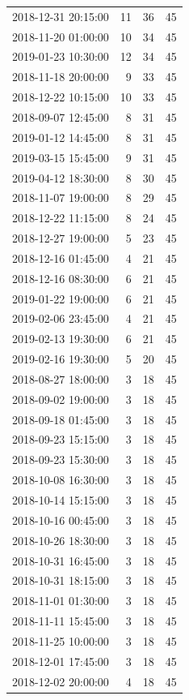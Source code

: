 \begin{tabular}{lrrr}
2018-12-31 20:15:00 & 11 & 36 & 45 \\
2018-11-20 01:00:00 & 10 & 34 & 45 \\
2019-01-23 10:30:00 & 12 & 34 & 45 \\
2018-11-18 20:00:00 & 9 & 33 & 45 \\
2018-12-22 10:15:00 & 10 & 33 & 45 \\
2018-09-07 12:45:00 & 8 & 31 & 45 \\
2019-01-12 14:45:00 & 8 & 31 & 45 \\
2019-03-15 15:45:00 & 9 & 31 & 45 \\
2019-04-12 18:30:00 & 8 & 30 & 45 \\
2018-11-07 19:00:00 & 8 & 29 & 45 \\
2018-12-22 11:15:00 & 8 & 24 & 45 \\
2018-12-27 19:00:00 & 5 & 23 & 45 \\
2018-12-16 01:45:00 & 4 & 21 & 45 \\
2018-12-16 08:30:00 & 6 & 21 & 45 \\
2019-01-22 19:00:00 & 6 & 21 & 45 \\
2019-02-06 23:45:00 & 4 & 21 & 45 \\
2019-02-13 19:30:00 & 6 & 21 & 45 \\
2019-02-16 19:30:00 & 5 & 20 & 45 \\
2018-08-27 18:00:00 & 3 & 18 & 45 \\
2018-09-02 19:00:00 & 3 & 18 & 45 \\
2018-09-18 01:45:00 & 3 & 18 & 45 \\
2018-09-23 15:15:00 & 3 & 18 & 45 \\
2018-09-23 15:30:00 & 3 & 18 & 45 \\
2018-10-08 16:30:00 & 3 & 18 & 45 \\
2018-10-14 15:15:00 & 3 & 18 & 45 \\
2018-10-16 00:45:00 & 3 & 18 & 45 \\
2018-10-26 18:30:00 & 3 & 18 & 45 \\
2018-10-31 16:45:00 & 3 & 18 & 45 \\
2018-10-31 18:15:00 & 3 & 18 & 45 \\
2018-11-01 01:30:00 & 3 & 18 & 45 \\
2018-11-11 15:45:00 & 3 & 18 & 45 \\
2018-11-25 10:00:00 & 3 & 18 & 45 \\
2018-12-01 17:45:00 & 3 & 18 & 45 \\
2018-12-02 20:00:00 & 4 & 18 & 45 \\

\end{tabular}
